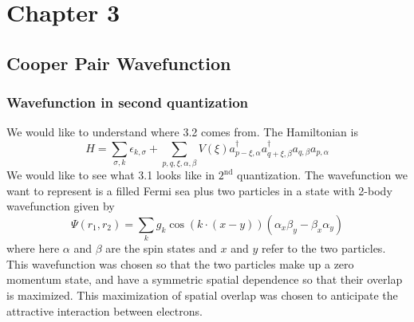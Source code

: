 \documentclass{article}
\begin{document}
\section*{Chapter 3}


\subsection*{Cooper Pair Wavefunction}


\subsubsection*{Wavefunction in second quantization}

We would like to understand where 3.2 comes from. The Hamiltonian
is\[
H=\sum_{\sigma,k}\epsilon_{k,\sigma}+\sum_{p,q,\xi,\alpha,\beta}V(\xi)a_{p-\xi,\alpha}^{\dagger}a_{q+\xi,\beta}^{\dagger}a_{q,\beta}a_{p,\alpha}\]
We would like to see what 3.1 looks like in $2^{\textrm{nd}}$ quantization.
The wavefunction we want to represent is a filled Fermi sea plus two
particles in a state with 2-body wavefunction given by\[
\Psi(r_{1},r_{2})=\sum_{k}g_{k}\cos\left(k\cdot(x-y)\right)\left(\alpha_{x}\beta_{y}-\beta_{x}\alpha_{y}\right)\]
where here $\alpha$ and $\beta$ are the spin states and $x$ and
$y$ refer to the two particles. This wavefunction was chosen so that
the two particles make up a zero momentum state, and have a symmetric
spatial dependence so that their overlap is maximized. This maximization
of spatial overlap was chosen to anticipate the attractive interaction
between electrons.
\end{document}
